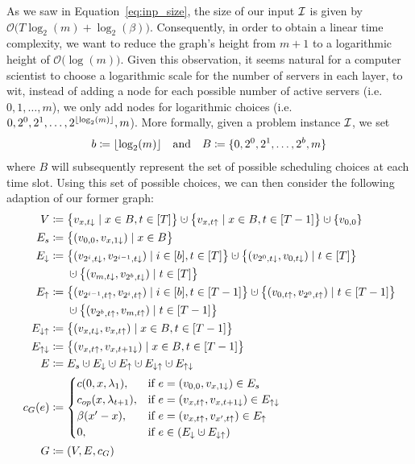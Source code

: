 As we saw in Equation~\eqref{eq:inp_size}, the size of our input $\mathcal{I}$ is given by $\mathcal{O}\bigl(T\log_2(m)+\log_2(\beta)\bigr)$. Consequently, in order to obtain a linear time complexity, we want to reduce the graph's height from $m+1$ to a logarithmic height of $\mathcal{O}\bigl(\log(m)\bigr)$. Given this observation, it seems natural for a computer scientist to choose a logarithmic scale for the number of servers in each layer, to wit, instead of adding a node for each possible number of active servers (i.e.\ $0,1,\dotsc,m$), we only add nodes for logarithmic choices (i.e.\ $0,2^0,2^1,\dotsc,2^{\lfloor\log_2(m)\rfloor},m$). More formally, given a problem instance $\mathcal{I}$, we set
\begin{align*}
	b\coloneqq\lfloor\log_2(m)\rfloor&&\text{and}&&B\coloneqq\{0,2^0,2^1,\dotsc,2^b,m\}
\end{align*}
where $B$ will subsequently represent the set of possible scheduling choices at each time slot. Using this set of possible choices, we can then consider the following adaption of our former graph:
\begin{align*}
	V&\coloneqq\bigl\{v_{x,t\downarrow}\mid x\in B,t\in[T]\bigr\}\dotcup\bigl\{v_{x,t\uparrow}\mid x\in B, t\in[T-1]\bigr\}\dotcup\{v_{0,0}\}\\
	E_s&\coloneqq\bigl\{(v_{0,0},v_{x,1\downarrow})\mid x\in B\bigr\}\\
	E_\downarrow&\coloneqq\bigl\{(v_{2^i,t\downarrow},v_{2^{i-1},t\downarrow})\mid i\in[b],t\in[T]\bigr\}\dotcup\bigl\{(v_{2^0,t\downarrow},v_{0,t\downarrow})\mid t\in[T]\bigr\}\\
	&\phantom{{}\coloneqq{}}\dotcup\bigl\{(v_{m,t\downarrow},v_{2^b,t\downarrow})\mid t\in[T]\bigr\}\\
	E_\uparrow&\coloneqq\bigl\{(v_{2^{i-1},t\uparrow},v_{2^i,t\uparrow})\mid i\in[b],t\in[T-1]\bigr\}\dotcup\bigl\{(v_{0,t\uparrow},v_{2^0,t\uparrow})\mid t\in[T-1]\bigr\}\\
	&\phantom{{}\coloneqq{}}\dotcup\bigl\{(v_{2^b,t\uparrow},v_{m,t\uparrow})\mid t\in[T-1]\bigr\}\\
	E_{\downarrow\uparrow}&\coloneqq\bigl\{(v_{x,t\downarrow},v_{x,t\uparrow})\mid x\in B,t\in[T-1]\bigr\}\\
	E_{\uparrow\downarrow}&\coloneqq\bigl\{(v_{x,t\uparrow},v_{x,t+1\downarrow})\mid x\in B,t\in[T-1]\bigr\}\\
	E&\coloneqq E_s\dotcup E_\downarrow\dotcup E_\uparrow\dotcup E_{\downarrow\uparrow}\dotcup E_{\uparrow\downarrow}\\
	c_G(e)&\coloneqq
	\begin{cases}
		\costs(0,x,\lambda_1), & \text{if $e=(v_{0,0},v_{x,1\downarrow})\in E_s$}\\
		\opcosts(x,\lambda_{t+1}), & \text{if $e=(v_{x,t\uparrow},v_{x,t+1\downarrow})\in E_{\uparrow\downarrow}$}\\
		\beta(x'-x), & \text{if $e=(v_{x,t\uparrow},v_{x',t\uparrow})\in E_\uparrow$}\\
		0, & \text{if $e\in(E_\downarrow\dotcup E_{\downarrow\uparrow})$}
	\end{cases}\\
	G&\coloneqq(V,E,c_G)
\end{align*}
